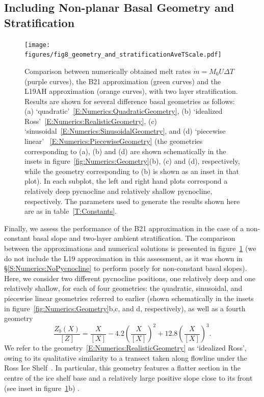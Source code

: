 \documentclass[openacc]{rsproca_new}%
\begin{document}
\subsection{Including Non-planar Basal Geometry and Stratification}
\begin{figure}
\centering
\texttt{[image: figures/fig8\_geometry\_and\_stratificationAveTScale.pdf]}
\caption{Comparison between numerically obtained melt rates $\dot{m}= M_0 U \Delta T$ (purple curves), the B21 approximation (green curves) and the L19AH approximation (orange curves), with two layer stratification. Results are shown for several difference basal geometries as follows: (a) `quadratic'~\eqref{E:Numerics:QuadraticGeometry}, (b) `idealized Ross'~\eqref{E:Numerics:RealisticGeometry}, (c) `sinusoidal~\eqref{E:Numerics:SinusoidalGeometry}, and (d) `piecewise linear' ~\eqref{E:Numerics:PiecewiseGeometry} (the geometries corresponding to (a), (b) and (d) are shown schematically in the insets in figure~\ref{fig:Numerics:Geometry}(b), (c) and (d), respectively, while the geometry corresponding to (b) is shown as an inset in that plot). In each subplot, the left and right hand plots correspond a relatively deep pycnocline and relatively shallow pycnocline, respectively.  The parameters used to generate the results shown here are as in table~\ref{T:Constants}. }\label{fig:Numerics:pycnocline_and_geometry_idealized}
\end{figure}

Finally, we assess the performance of the B21 approximation in the case of a non-constant basal slope and two-layer ambient stratification. The comparison between the approximations and numerical solutions is presented in figure~\ref{fig:Numerics:pycnocline_and_geometry_idealized} (we do not include the L19 approximation in this assessment, as it was shown in \S\ref{S:Numerics:NoPycnocline} to perform poorly for non-constant basal slopes). Here, we consider two different pycnocline positions, one relatively deep and one relatively shallow, for each of four geometries: the quadratic, sinusoidal, and piecewise linear geometries referred to earlier (shown schematically in the insets in figure~\ref{fig:Numerics:Geometry}b,c, and d, respectively), as well as a fourth geometry 
\begin{equation}\label{E:Numerics:RealisticGeometry}
\frac{Z_b(X)}{\left[Z\right]}= \frac{X}{\left[X\right]} -4.2\left(\frac{X}{\left[X\right]}\right)^2 + 12.8\left(\frac{X}{\left[X\right]}\right)^3.
\end{equation}
We refer to the geometry~\eqref{E:Numerics:RealisticGeometry} as `idealized Ross', owing to its qualitative similarity to a transect taken along flowline under the Ross Ice Shelf~\citep{Shabtaie1987JGeophysResSolidEarth}. In particular, this geometry features a flatter section in the centre of the ice shelf base and a relatively large positive slope close to its front (see inset in figure~\ref{fig:Numerics:pycnocline_and_geometry_idealized}b) .
\end{document}
